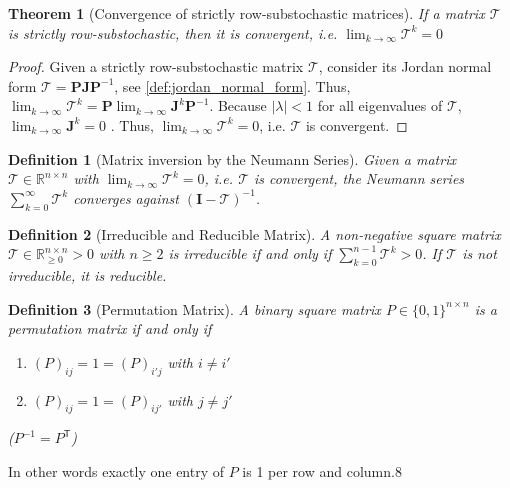 \documentclass[journal,compsoc,10pt]{IEEEtran}
\newcommand{\RR}{\mathbb{R}}
\newcommand{\tT}{\mathcal{T}} %
\newcommand{\tod}{\todo[color=red!40]} %
\newcommand{\T}{\mathsf{T}}            %
\renewcommand{\vec}[1]{\bm{#1}}        %
\newcommand{\mat}[1]{\bm{#1}}          %
\newcommand{\eye}{\bm{I}}              %
\newtheorem{theorem}{Theorem}[section]
\newtheorem{definition}{Definition}[section]
\begin{document}
\begin{theorem}[Convergence of strictly row-substochastic matrices]\label{th:convergence_strictly_row-substoch}
    If a matrix $\mat \tT$ is strictly row-substochastic, then it is convergent, i.e. $\lim_{k\rightarrow \infty}\mat \tT^k = 0$
\end{theorem}

\begin{proof}
    Given a strictly row-substochastic matrix $\mat \tT$, consider its Jordan normal form $\mat \tT = \mat P \mat J \mat P^{-1}$, see \cref{def:jordan_normal_form}. Thus, $\lim_{k\rightarrow \infty} \mat \tT^k = \mat P\lim_{k\rightarrow \infty} \mat J^k \mat P^{-1}$. Because $|\lambda| < 1$ for all eigenvalues of $\mat \tT$, $\lim_{k\rightarrow \infty} \mat J^k = 0$ \tod{explain more in detail?}. Thus,  $\lim_{k\rightarrow \infty} \mat \tT^k = 0$, i.e. $\mat \tT$ is convergent.
\end{proof}

\begin{definition}[Matrix inversion by the Neumann Series]\label{def:neumann_series}
    Given a matrix $\tT\in \RR^{n\times n}$ with $\lim_{k\rightarrow \infty}\tT^k = 0$, i.e. $\tT$ is convergent, the Neumann series $\sum_{k=0}^\infty \tT^k$ converges against $(\eye - \tT)^{-1}$.
\end{definition}

\begin{definition}[Irreducible and Reducible Matrix]
    A non-negative square matrix $\tT\in \RR_{\geq 0}^{n\times n}>0$ with $n\geq 2$ is irreducible if and only if $\sum_{k=0}^{n-1}\tT^k>0$. If $\tT$ is not irreducible, it is reducible.
\end{definition}

\begin{definition}[Permutation Matrix]
    A binary square matrix $P\in\{0,1\}^{n\times n}$ is a permutation matrix if and only if
    \begin{enumerate}[label=(\roman*)]
        \item $(P)_{ij} = 1 = (P)_{i'j}$ with $i\neq i'$       \item $(P)_{ij} = 1 = (P)_{ij'}$ with $j\neq j'$
    \end{enumerate}
    ($P^{-1} = P^\T$)
\end{definition}
In other words exactly one entry of $P$ is 1 per row and column.8
\end{document}

